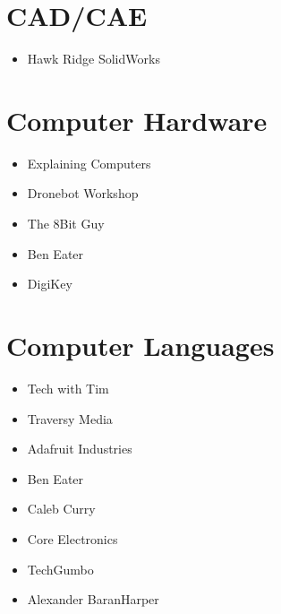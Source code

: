 \documentclass[letterpaper,10pt,english,openany,oneside]{sphinxmanual}
\begin{document}
\section{CAD/CAE}
\label{\detokenize{youtube:cad-cae}}\begin{itemize}
\item {} 
\sphinxAtStartPar
Hawk Ridge SolidWorks

\end{itemize}


\section{Computer Hardware}
\label{\detokenize{youtube:computer-hardware}}\begin{itemize}
\item {} 
\sphinxAtStartPar
Explaining Computers

\item {} 
\sphinxAtStartPar
Dronebot Workshop

\item {} 
\sphinxAtStartPar
The 8\sphinxhyphen{}Bit Guy

\item {} 
\sphinxAtStartPar
Ben Eater

\item {} 
\sphinxAtStartPar
Digi\sphinxhyphen{}Key

\end{itemize}


\section{Computer Languages}
\label{\detokenize{youtube:computer-languages}}\begin{itemize}
\item {} 
\sphinxAtStartPar
Tech with Tim

\item {} 
\sphinxAtStartPar
Traversy Media

\item {} 
\sphinxAtStartPar
Adafruit Industries

\item {} 
\sphinxAtStartPar
Ben Eater

\item {} 
\sphinxAtStartPar
Caleb Curry

\item {} 
\sphinxAtStartPar
Core Electronics

\item {} 
\sphinxAtStartPar
TechGumbo

\item {} 
\sphinxAtStartPar
Alexander Baran\sphinxhyphen{}Harper

\end{itemize}
\end{document}
